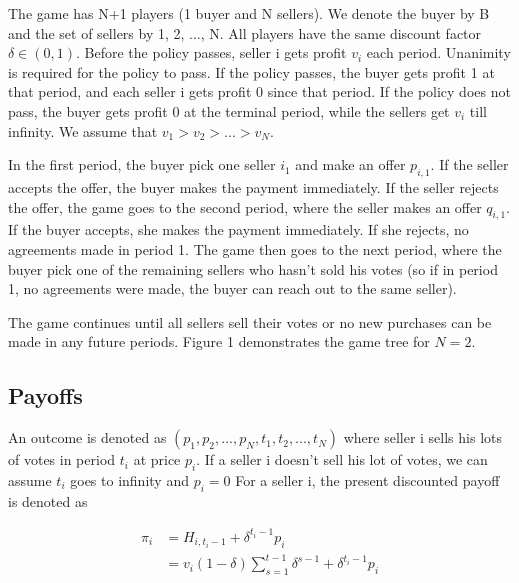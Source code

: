 \documentclass[ProjectGAZ]{subfiles}
\begin{document}
The game has N+1 players (1 buyer and N sellers). We denote the buyer by B and the set of sellers by {1, 2, ..., N}. All players have the same discount factor $\delta \in (0, 1)$. Before the policy passes, seller i gets profit $v_i$ each period. Unanimity is required for the policy to pass. If the policy passes, the buyer gets profit 1 at that period, and each seller i gets profit 0 since that period. If the policy does not pass, the buyer gets profit 0 at the terminal period, while the sellers get $v_i$ till infinity. We assume that $v_1 > v_2 > ... > v_N$.

In the first period, the buyer pick one seller $i_1$ and make an offer $p_{i,1}$. If the seller accepts the offer, the buyer makes the payment immediately. If the seller rejects the offer, the game goes to the second period, where the seller makes an offer $q_{i, 1}$. If the buyer accepts, she makes the payment immediately. If she rejects, no agreements made in period 1. The game then goes to the next period, where the buyer pick one of the remaining sellers who hasn't sold his votes (so if in period 1, no agreements were made, the buyer can reach out to the same seller).

The game continues until all sellers sell their votes or no new purchases can be made in any future periods. Figure 1 demonstrates the game tree for $N = 2$.

\providecommand{\figName}{Xiao2seller}
\providecommand{\figFile}{\figName}
\hypertarget{\figFile}{}



\subsection{Payoffs}\label{subsec:Xiao-Payoff}

An outcome is denoted as $(p_1, p_2, ..., p_N, t_1, t_2, ..., t_N)$ where seller i sells his lots of votes in period $t_i$ at price $p_i$. If a seller i doesn't sell his lot of votes, we can assume $t_i$ goes to infinity and $p_i= 0$  For a seller i, the present discounted payoff is denoted as

\begin{align}
  \pi_i &= H_{i, t_i-1} + \delta^{t_i-1}p_i \\
        &= v_i(1-\delta)\sum_{s=1}^{t-1} \delta^{s-1} + \delta^{t_i-1}p_i  \label{eq:XiaoSPO}
\end{align}
\end{document}
